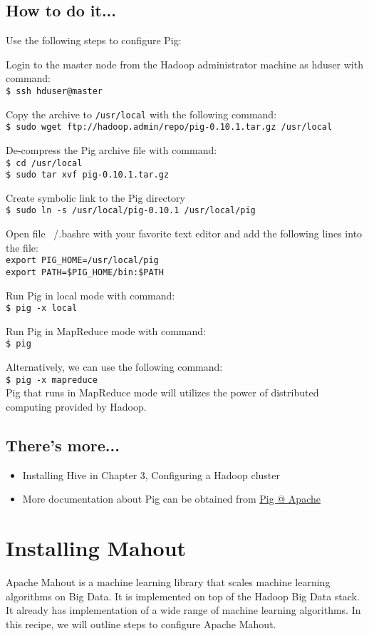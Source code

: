 \subsection*{How to do it...}
Use the following steps to configure Pig:

Login to the master node from the Hadoop administrator machine as hduser with command: \\
\verb|$ ssh hduser@master|

Copy the archive to \verb|/usr/local| with the following command: \\
\verb|$ sudo wget ftp://hadoop.admin/repo/pig-0.10.1.tar.gz /usr/local|

De-compress the Pig archive file with command:\\
\verb|$ cd /usr/local| \\
\verb|$ sudo tar xvf pig-0.10.1.tar.gz|

Create symbolic link to the Pig directory \\
\verb|$ sudo ln -s /usr/local/pig-0.10.1 /usr/local/pig|

Open file ~/.bashrc with your favorite text editor and add the following lines into the file: \\
\verb|export PIG_HOME=/usr/local/pig| \\
\verb|export PATH=$PIG_HOME/bin:$PATH|

Run Pig in local mode with command: \\
\verb|$ pig -x local|

Run Pig in MapReduce mode with command: \\
\verb|$ pig|

Alternatively, we can use the following command: \\
\verb|$ pig -x mapreduce| \\
Pig that runs in MapReduce mode will utilizes the power of distributed computing provided by Hadoop.

\subsection*{There's more...}
\begin{itemize}
  \item Installing Hive in Chapter 3, Configuring a Hadoop cluster
  \item More documentation about Pig can be obtained from \href{http://pig.apache.org/docs/r0.10.0/}{Pig @ Apache}
\end{itemize}

\section{Installing Mahout}
Apache Mahout is a machine learning library that scales machine learning algorithms on Big Data. It is implemented on top of the Hadoop Big Data stack. It already has implementation of a wide range of machine learning algorithms. In this recipe, we will outline steps to configure Apache Mahout.
